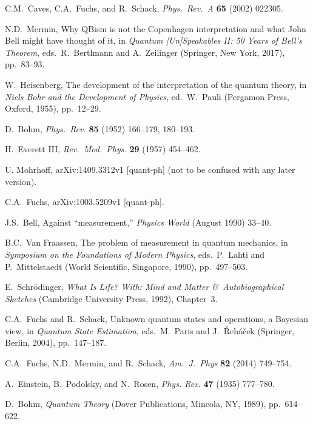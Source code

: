 \documentclass[12pt]{article}
\begin{document}
\begin{thebibliography}{99}
 C.M.\ Caves, C.A.\ Fuchs, and R.\ Schack, \emph{Phys.\ Rev.\ A} \textbf{65} (2002) 022305.

 N.D.\ Mermin, Why QBism is not the Copenhagen interpretation and what John Bell might have thought of it, in \textit{Quantum [Un]Speakables II: 50 Years of Bell's Theorem}, eds.\ R.\ Bertlmann and A.\ Zeilinger (Springer, New York, 2017), pp.\ 83--93.

 W.\ Heisenberg, The development of the interpretation of the quantum theory, in \textit{Niels Bohr and the Development of Physics}, ed.\ W.\ Pauli (Pergamon Press, Oxford, 1955), pp.\ 12--29.

 D.\ Bohm, \textit{Phys.\ Rev.} \textbf{85} (1952) 166--179, 180--193.

 H.\ Everett III, \textit{Rev.\ Mod.\ Phys.} \textbf{29} (1957)  454--462.

 U. Mohrhoff,  arXiv:1409.3312v1 [quant-ph] (not to be confused with any later version).

 C.A.\ Fuchs,  arXiv:1003.5209v1  [quant-ph].

  J.S.\ Bell, Against ``measurement,'' \textit{Physics World} (August 1990) 33--40.

 B.C.\ Van Fraassen, The problem of measurement in quantum mechanics, in \textit{Symposium on the Foundations of Modern Physics}, eds.\ P.\ Lahti and P.\ Mittelstaedt (World Scientific, Singapore, 1990), pp.\ 497--503.

 E.\ Schr\"odinger, \textit{What Is Life? With: Mind and Matter \&\ Autobiographical Sketches} (Cambridge University Press, 1992), Chapter~3.

 C.A.\ Fuchs and R.\ Schack, Unknown quantum states and operations, a Bayesian view, in \textit{Quantum State Estimation}, eds.\ M.\ Paris and J.\ \v{R}eh\'{a}\v{c}ek (Springer, Berlin, 2004), pp.\ 147--187.

  C.A.\ Fuchs, N.D.\ Mermin, and R.\ Schack, \textit{Am.\ J.\ Phys} \textbf{82} (2014) 749--754.

 A.\ Einstein, B.\ Podolsky, and N.\ Rosen, \emph{Phys. Rev.} \textbf{47} (1935) 777--780.

 D.\ Bohm, \emph{Quantum Theory} (Dover Publications, Mineola, NY, 1989), pp.\ 614--622.


\end{thebibliography}
\end{document}
